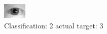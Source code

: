\begin{figure}[h!]
\begin{center}
\includegraphics[width=0.60\columnwidth]{figures/ID1119_class_2_target_3.png}
\end{center}
\caption{ Classification: 2 actual target: 3}
\label{fig:ID1119_class_2_target_3}
\end{figure}
